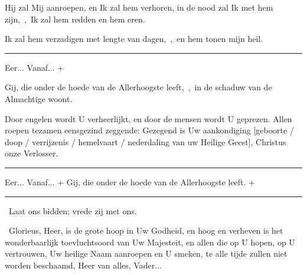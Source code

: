 \documentclass[12pt,twoside,a5paper]{article}
\begin{document}
\begin{halfparskip}
  Hij zal Mij aanroepen, en Ik zal hem verhoren, in de nood zal Ik met hem zijn,~\sep\ Ik zal hem redden en hem eren.

  Ik zal hem verzadigen met lengte van dagen,~\sep\ en hem tonen mijn heil.

  \noindent\rule{\textwidth}{0.5pt}

    

  Eer... Vanaf... + 

   Gij, die onder de hoede van de Allerhoogste leeft,~\sep\ in de schaduw van de Almachtige woont.

   Door engelen wordt U verheerlijkt, en door de mensen wordt U geprezen. Allen roepen tezamen eensgezind zeggende: Gezegend is Uw aankondiging [geboorte / doop / verrijzenis / hemelvaart / nederdaling van uw Heilige Geest], Christus onze Verlosser.

  \noindent\rule{\textwidth}{0.5pt}

   Eer... Vanaf... +  Gij, die onder de hoede van de Allerhoogste leeft. + 

  \noindent\rule{\textwidth}{0.5pt}
\end{halfparskip}

\begin{halfparskip}
  \dd~Laat ons bidden; vrede zij met ons.

  \cc~Glorieus, Heer, is de grote hoop in Uw Godheid, en hoog en verheven is het wonderbaarlijk toevluchtsoord van Uw Majesteit, en allen die op U hopen, op U vertrouwen, Uw heilige Naam aanroepen en U smeken, te alle tijde zullen niet worden beschaamd, Heer van alles, Vader...
\end{halfparskip}
\end{document}
